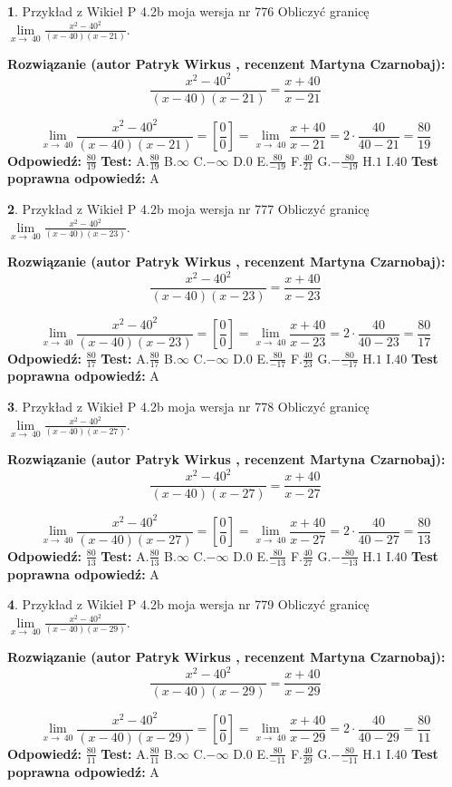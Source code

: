 \documentclass[12pt, a4paper]{article}
\theoremstyle{definition} %
\newtheorem{zad}{}
\newcommand{\zadStart}[1]{\begin{zad}#1\newline}
\newcommand{\zadStop}{\end{zad}}
\newcommand{\rozwStart}[2]{\noindent \textbf{Rozwiązanie (autor #1 , recenzent #2): }\newline}
\newcommand{\rozwStop}{\newline}
\newcommand{\odpStart}{\noindent \textbf{Odpowiedź:}\newline}
\newcommand{\odpStop}{\newline}
\newcommand{\testStart}{\noindent \textbf{Test:}\newline}
\newcommand{\testStop}{\newline}
\newcommand{\kluczStart}{\noindent \textbf{Test poprawna odpowiedź:}\newline}
\newcommand{\kluczStop}{\newline}
\begin{document}
\zadStart{Przykład z Wikieł P 4.2b moja wersja nr 776}
Obliczyć granicę $\lim\limits_{x\to\ 40}\frac{x^{2}-40^{2}}{(x-40)(x-21)}$.
\zadStop
\rozwStart{Patryk Wirkus}{Martyna Czarnobaj}
$$\frac{x^{2}-40^{2}}{(x-40)(x-21)}=\frac{x+40}{x-21}$$

$$\lim\limits_{x\to\ 40}\frac{x^{2}-40^{2}}{(x-40)(x-21)}=[\frac{0}{0}]=\lim\limits_{x\to\ 40}\frac{x+40}{x-21}=2 \cdot \frac{40}{40-21} = \frac{80}{19}$$
\rozwStop
\odpStart
$\frac{80}{19}$
\odpStop
\testStart
A.$\frac{80}{19}$
B.$\infty$
C.$-\infty$
D.$0$
E.$\frac{80}{-19}$
F.$\frac{40}{21}$
G.$-\frac{80}{-19}$
H.$1$
I.$40$
\testStop
\kluczStart
A
\kluczStop



\zadStart{Przykład z Wikieł P 4.2b moja wersja nr 777}
Obliczyć granicę $\lim\limits_{x\to\ 40}\frac{x^{2}-40^{2}}{(x-40)(x-23)}$.
\zadStop
\rozwStart{Patryk Wirkus}{Martyna Czarnobaj}
$$\frac{x^{2}-40^{2}}{(x-40)(x-23)}=\frac{x+40}{x-23}$$

$$\lim\limits_{x\to\ 40}\frac{x^{2}-40^{2}}{(x-40)(x-23)}=[\frac{0}{0}]=\lim\limits_{x\to\ 40}\frac{x+40}{x-23}=2 \cdot \frac{40}{40-23} = \frac{80}{17}$$
\rozwStop
\odpStart
$\frac{80}{17}$
\odpStop
\testStart
A.$\frac{80}{17}$
B.$\infty$
C.$-\infty$
D.$0$
E.$\frac{80}{-17}$
F.$\frac{40}{23}$
G.$-\frac{80}{-17}$
H.$1$
I.$40$
\testStop
\kluczStart
A
\kluczStop



\zadStart{Przykład z Wikieł P 4.2b moja wersja nr 778}
Obliczyć granicę $\lim\limits_{x\to\ 40}\frac{x^{2}-40^{2}}{(x-40)(x-27)}$.
\zadStop
\rozwStart{Patryk Wirkus}{Martyna Czarnobaj}
$$\frac{x^{2}-40^{2}}{(x-40)(x-27)}=\frac{x+40}{x-27}$$

$$\lim\limits_{x\to\ 40}\frac{x^{2}-40^{2}}{(x-40)(x-27)}=[\frac{0}{0}]=\lim\limits_{x\to\ 40}\frac{x+40}{x-27}=2 \cdot \frac{40}{40-27} = \frac{80}{13}$$
\rozwStop
\odpStart
$\frac{80}{13}$
\odpStop
\testStart
A.$\frac{80}{13}$
B.$\infty$
C.$-\infty$
D.$0$
E.$\frac{80}{-13}$
F.$\frac{40}{27}$
G.$-\frac{80}{-13}$
H.$1$
I.$40$
\testStop
\kluczStart
A
\kluczStop



\zadStart{Przykład z Wikieł P 4.2b moja wersja nr 779}
Obliczyć granicę $\lim\limits_{x\to\ 40}\frac{x^{2}-40^{2}}{(x-40)(x-29)}$.
\zadStop
\rozwStart{Patryk Wirkus}{Martyna Czarnobaj}
$$\frac{x^{2}-40^{2}}{(x-40)(x-29)}=\frac{x+40}{x-29}$$

$$\lim\limits_{x\to\ 40}\frac{x^{2}-40^{2}}{(x-40)(x-29)}=[\frac{0}{0}]=\lim\limits_{x\to\ 40}\frac{x+40}{x-29}=2 \cdot \frac{40}{40-29} = \frac{80}{11}$$
\rozwStop
\odpStart
$\frac{80}{11}$
\odpStop
\testStart
A.$\frac{80}{11}$
B.$\infty$
C.$-\infty$
D.$0$
E.$\frac{80}{-11}$
F.$\frac{40}{29}$
G.$-\frac{80}{-11}$
H.$1$
I.$40$
\testStop
\kluczStart
A
\kluczStop
\end{document}
